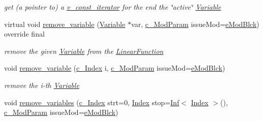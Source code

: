\begin{Indent}
\begin{DoxyCompactItemize}
\begin{DoxyCompactList}\small\item\em get (a pointer to) a \mbox{\hyperlink{class_s_m_spp__di__unipi__it_1_1_linear_function_1_1v__const__iterator}{v\+\_\+const\+\_\+iterator}} for the end the \char`\"{}active\char`\"{} \mbox{\hyperlink{class_s_m_spp__di__unipi__it_1_1_variable}{Variable}} \end{DoxyCompactList}\item 
virtual void \mbox{\hyperlink{class_s_m_spp__di__unipi__it_1_1_linear_function_a93e2cec0e8b8fbd10ad9bd5c5136a99a}{remove\+\_\+variable}} (\mbox{\hyperlink{class_s_m_spp__di__unipi__it_1_1_variable}{Variable}} $\ast$var, \mbox{\hyperlink{group___modification___t_y_p_e_s_ga544246d8c462e9a2d817c2c30797968f}{c\+\_\+\+Mod\+Param}} issue\+Mod=\mbox{\hyperlink{group___modification___t_y_p_e_s_gga48fddcdd03a03f49b7e389ca1ed938d4a21b14b26b1c0093a0905f6fc010bad29}{e\+Mod\+Blck}}) override final
\begin{DoxyCompactList}\small\item\em remove the given \mbox{\hyperlink{class_s_m_spp__di__unipi__it_1_1_variable}{Variable}} from the \mbox{\hyperlink{class_s_m_spp__di__unipi__it_1_1_linear_function}{Linear\+Function}} \end{DoxyCompactList}\item 
void \mbox{\hyperlink{class_s_m_spp__di__unipi__it_1_1_linear_function_aad852e9ce977216d4ed5dc7a4216845d}{remove\+\_\+variable}} (\mbox{\hyperlink{group___thin_var_dep_interface___c_l_a_s_s_e_s_gaee6156e2ce80720d57a082d80f39d8cc}{c\+\_\+\+Index}} i, \mbox{\hyperlink{group___modification___t_y_p_e_s_ga544246d8c462e9a2d817c2c30797968f}{c\+\_\+\+Mod\+Param}} issue\+Mod=\mbox{\hyperlink{group___modification___t_y_p_e_s_gga48fddcdd03a03f49b7e389ca1ed938d4a21b14b26b1c0093a0905f6fc010bad29}{e\+Mod\+Blck}})
\begin{DoxyCompactList}\small\item\em remove the i-\/th \mbox{\hyperlink{class_s_m_spp__di__unipi__it_1_1_variable}{Variable}} \end{DoxyCompactList}\item 
void \mbox{\hyperlink{class_s_m_spp__di__unipi__it_1_1_linear_function_aef04a025606c22b3e27b4aabc21b8dbc}{remove\+\_\+variables}} (\mbox{\hyperlink{group___thin_var_dep_interface___c_l_a_s_s_e_s_gaee6156e2ce80720d57a082d80f39d8cc}{c\+\_\+\+Index}} strt=0, \mbox{\hyperlink{group___thin_var_dep_interface___c_l_a_s_s_e_s_gad53d6229d7ec28555a9c9c2fd9abf773}{Index}} stop=\mbox{\hyperlink{class_s_m_spp__di__unipi__it_1_1_inf}{Inf}}$<$ \mbox{\hyperlink{group___thin_var_dep_interface___c_l_a_s_s_e_s_gad53d6229d7ec28555a9c9c2fd9abf773}{Index}} $>$(), \mbox{\hyperlink{group___modification___t_y_p_e_s_ga544246d8c462e9a2d817c2c30797968f}{c\+\_\+\+Mod\+Param}} issue\+Mod=\mbox{\hyperlink{group___modification___t_y_p_e_s_gga48fddcdd03a03f49b7e389ca1ed938d4a21b14b26b1c0093a0905f6fc010bad29}{e\+Mod\+Blck}})

\end{DoxyCompactItemize}
\end{Indent}
